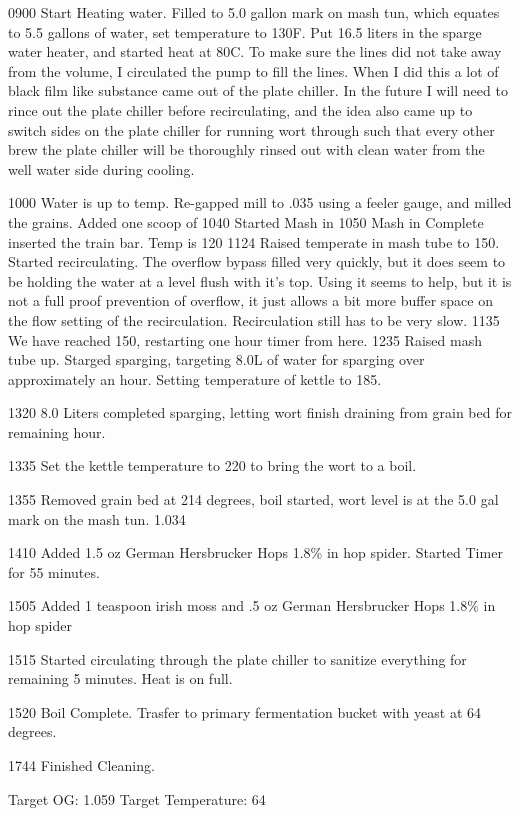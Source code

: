 0900 Start Heating water.  Filled to 5.0 gallon mark on mash tun, which equates to 5.5 gallons of water, set temperature to 130F.  Put 16.5 liters in the sparge water heater, and started heat at 80C.  To make sure the lines did not take away from the volume, I circulated the pump to fill the lines.  When I did this a lot of black film like substance came out of the plate chiller.  In the future I will need to rince out the plate chiller before recirculating, and the idea also came up to switch sides on the plate chiller for running wort through such that every other brew the plate chiller will be thoroughly rinsed out with clean water from the well water side during cooling.

1000 Water is up to temp.  Re-gapped mill to .035 using a feeler gauge, and milled the grains.  Added one scoop of 
1040 Started Mash in
1050 Mash in Complete inserted the train bar. Temp is 120
1124 Raised temperate in mash tube to 150.  Started recirculating. The overflow bypass filled very quickly, but it does seem to be holding the water at a level flush with it's top.  Using it seems to help, but it is not a full proof prevention of overflow, it just allows a bit more buffer space on the flow setting of the recirculation.  Recirculation still has to be very slow.
1135 We have reached 150, restarting one hour timer from here.
1235 Raised mash tube up. Starged sparging, targeting 8.0L of water for sparging over approximately an hour.  Setting temperature of kettle to 185.

1320 8.0 Liters completed sparging, letting wort finish draining from grain bed for remaining hour.

1335 Set the kettle temperature to 220 to bring the wort to a boil.

1355 Removed grain bed at 214 degrees, boil started, wort level is at the 5.0 gal mark on the mash tun. 1.034

1410 Added 1.5 oz German Hersbrucker Hops 1.8\% in hop spider.  Started Timer for 55 minutes.

1505 Added 1 teaspoon irish moss and .5 oz  German Hersbrucker Hops 1.8\% in hop spider

1515 Started circulating through the plate chiller to sanitize everything for remaining 5 minutes.  Heat is on full.

1520 Boil Complete.  Trasfer to primary fermentation bucket with yeast at 64 degrees.

1744 Finished Cleaning.

Target OG: 1.059
Target Temperature: 64

